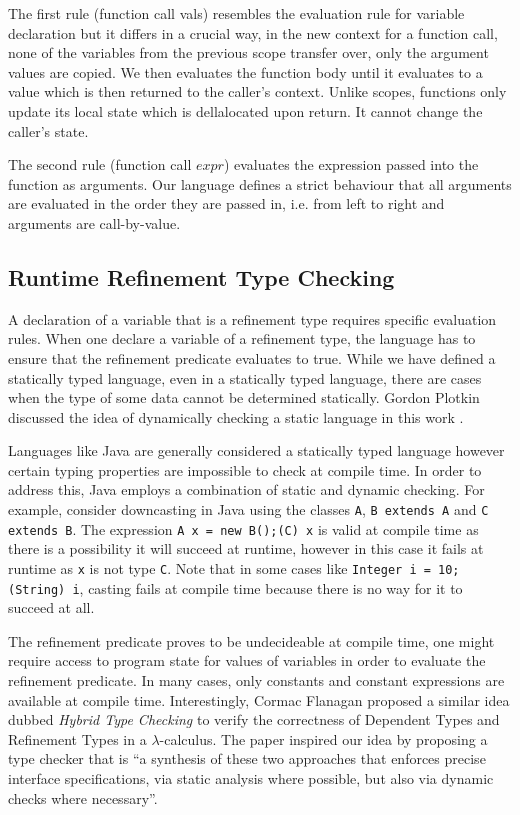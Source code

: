 \documentclass[a4paper,12pt]{report}
\begin{document}
\par
The first rule (function call vals) resembles the evaluation rule for 
variable declaration but it differs in a crucial way, in the new context for a 
function call, none of the variables from the previous scope transfer over, only 
the argument values are copied. We then evaluates the function body until it 
evaluates to a value which is then returned to the caller's context. Unlike 
scopes, functions only update its local state which is dellalocated upon return. 
It cannot change the caller's state. 

\par
The second rule (function call $expr$) evaluates the expression passed into the 
function as arguments. Our language defines a strict behaviour that all 
arguments are evaluated in the order they are passed in, i.e. from left to right 
and arguments are call-by-value.

\subsection{Runtime Refinement Type Checking}
A declaration of a variable that is a refinement type requires specific 
evaluation rules. When one declare 
a variable of a refinement type, the language has to ensure that the refinement 
predicate evaluates to true. While we have defined a statically typed language, even in a statically 
typed language, there are cases when the type of some data cannot be determined 
statically. Gordon Plotkin discussed the idea of dynamically checking a static 
language in this work \cite{dynamicCheckStaticLanguage}.

\par
Languages like Java are generally considered a statically typed language  
however certain typing properties are impossible to check at compile time. In 
order to address this, Java employs a combination of static and dynamic checking. For example, 
consider downcasting in Java using the classes \verb|A|, \verb|B extends A| and 
\verb|C extends B|. The expression \verb|A x = new B();(C) x| 
is valid at compile time as there is a possibility it will succeed at 
runtime, however in this case it fails at runtime as \verb|x| is not type \verb|C|. Note 
that in some cases like \verb|Integer i = 10; (String) i|, 
casting fails at compile time because there is no way for it to succeed at all. 

\par
The refinement predicate proves to be undecideable at compile time, one might 
require access to program state for values of variables in order 
to evaluate the refinement predicate. In many cases, 
only constants and constant expressions are available at compile time. 
Interestingly, Cormac Flanagan proposed a similar idea dubbed \textit{Hybrid Type 
Checking} \cite{hybridTypeChecking} to verify the correctness of Dependent Types and Refinement Types 
in a $\lambda$-calculus. The paper inspired our idea by proposing a type checker that is 
``a synthesis of these two approaches that enforces precise interface 
specifications, via static analysis where possible, but also via 
dynamic checks where necessary''.
\end{document}
